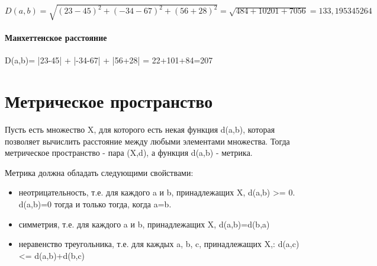 \documentclass{article}
\begin{document}
$D(a,b) = \sqrt{ (23-45)^2 + (-34-67)^2 + (56+28)^2} = \sqrt{484+10201+7056} = 133,195345264$

\paragraph{Манхеттенское расстояние }

D(a,b)= |23-45| + |-34-67| + |56+28| = 22+101+84=207


\section{Метрическое пространство }

 Пусть есть множество X, для которого есть некая функция d(a,b), которая позволяет вычислить расстояние между любыми элементами множества. Тогда метрическое пространство - пара (X,d), а функция d(a,b) - метрика.\par

Метрика должна обладать следующими свойствами:
\begin{itemize}
    \item неотрицательность, т.е. для каждого a и b, принадлежащих X, d(a,b) >= 0. d(a,b)=0 тогда и только тогда, когда a=b.
    \item симметрия, т.е. для каждого a и b, принадлежащих X, d(a,b)=d(b,a)
    \item неравенство треугольника, т.е. для каждых a, b, c, принадлежащих X,: d(a,c) <= d(a,b)+d(b,c)
\end{itemize}
\end{document}
